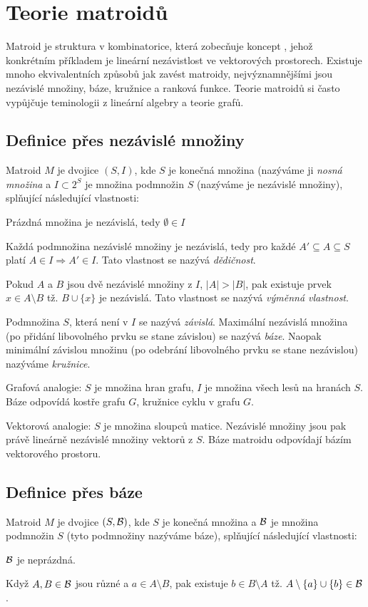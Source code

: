 \section{Teorie matroidů}

Matroid je struktura v kombinatorice, která zobecňuje koncept
, jehož konkrétním příkladem je lineární nezávistlost ve
vektorových prostorech. Existuje mnoho ekvivalentních způsobů jak zavést
matroidy, nejvýznamnějšími jsou nezávislé množiny, báze, kružnice a ranková
funkce. Teorie matroidů si často vypůjčuje teminologii z lineární algebry a
teorie grafů.

\subsection{Definice přes nezávislé množiny}
\df Matroid $M$ je dvojice $(S,I)$, kde $S$ je konečná množina (nazýváme ji
\emph{nosná množina} a $I \subset 2^S$ je množina podmnožin $S$ (nazýváme je
nezávislé množiny), splňující následující vlastnosti:
\begin{enumerate*}
\item Prázdná množina je nezávislá, tedy $\emptyset \in I$
\item Každá podmnožina nezávislé množiny je nezávislá, tedy pro každé $A' \subseteq A \subseteq S$ platí $A \in I \Rightarrow A' \in I$. Tato vlastnost se nazývá \emph{dědičnost}.
\item Pokud $A$ a $B$ jsou dvě nezávislé množiny z $I$, $|A| > |B|$, pak existuje prvek $x\in A\setminus B$ tž. $B\cup\{x\}$ je nezávislá. Tato vlastnost se nazývá \emph{výměnná vlastnost}.
\end{enumerate*}

\df Podmnožina $S$, která není v $I$ se nazývá \emph{závislá}. Maximální nezávislá
množina (po přidání libovolného prvku se stane závislou) se nazývá \emph{báze}.
Naopak minimální závislou množinu (po odebrání libovolného prvku se stane
nezávislou) nazýváme \emph{kružnice}.

\pzn Grafová analogie: $S$ je množina hran grafu, $I$ je množina všech lesů na
hranách $S$. Báze odpovídá kostře grafu $G$, kružnice cyklu v grafu $G$.

\pzn Vektorová analogie: $S$ je množina sloupců matice. Nezávislé množiny jsou
pak právě lineárně nezávislé množiny vektorů z $S$. Báze matroidu odpovídají
bázím vektorového prostoru. 

\subsection{Definice přes báze}
\df Matroid $M$ je dvojice $(S,\mathcal{B})$, kde $S$ je konečná množina a $\mathcal{B}$ je
množina podmnožin $S$ (tyto podmnožiny nazýváme báze), splňující následující
vlastnosti:
\begin{enumerate*}
\item $\mathcal{B}$ je neprázdná.
\item Když $A,B \in \mathcal{B}$ jsou různé a $a \in A\setminus B$, pak existuje $b \in B\setminus A$ tž. $A\setminus\{a\}\cup\{b\} \in \mathcal{B}$.
\end{enumerate*}

